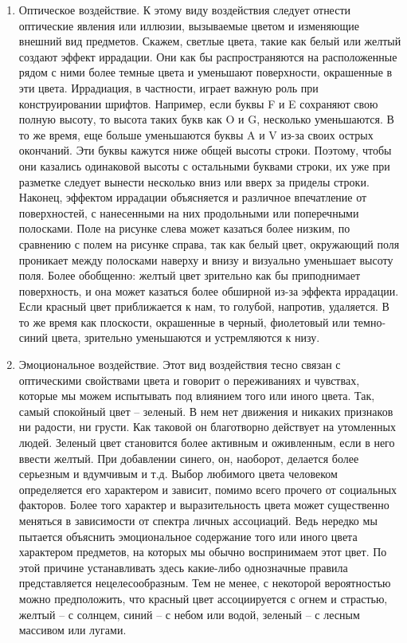 \begin{enumerate}
\item Оптическое воздействие. К этому виду воздействия следует отнести
  оптические явления или иллюзии, вызываемые цветом и изменяющие внешний вид
  предметов. Скажем, светлые цвета, такие как белый или желтый создают эффект
  иррадации. Они как бы распространяются на расположенные рядом с ними более
  темные цвета и уменьшают поверхности, окрашенные в эти цвета. Иррадиация,
  в частности, играет важную роль при конструировании шрифтов. Например, если
  буквы F и E сохраняют свою полную высоту, то высота таких букв как O и G,
  несколько уменьшаются. В то же время, еще больше уменьшаются буквы A и V
  из-за своих острых окончаний. Эти буквы кажутся ниже общей высоты строки.
  Поэтому, чтобы они казались одинаковой высоты с остальными буквами строки,
  их уже при разметке следует вынести несколько вниз или вверх за приделы строки.
  Наконец, эффектом иррадации объясняется и различное впечатление от поверхностей,
  с нанесенными на них продольными или поперечными полосками. %
  Поле на рисунке слева может казаться более низким, по сравнению с полем на
  рисунке справа, так как белый цвет, окружающий поля проникает между
  полосками наверху и внизу и визуально уменьшает высоту поля. Более
  обобщенно: желтый цвет зрительно как бы приподнимает поверхность, и она
  может казаться более обширной из-за эффекта иррадации. Если красный цвет
  приближается к нам, то голубой, напротив, удаляется. В то же время как
  плоскости, окрашенные в черный, фиолетовый или темно-синий цвета, зрительно
  уменьшаются и устремляются к низу.

\item Эмоциональное воздействие. Этот вид воздействия тесно связан с
  оптическими свойствами цвета и говорит о переживаниях и чувствах, которые
  мы можем испытывать под влиянием того или иного цвета. Так, самый спокойный
  цвет -- зеленый. В нем нет движения и никаких признаков ни радости, ни грусти.
  Как таковой он благотворно действует на утомленных людей. Зеленый цвет
  становится более активным и оживленным, если в него ввести желтый. При
  добавлении синего, он, наоборот, делается более серьезным и вдумчивым и т.д.
  Выбор любимого цвета человеком определяется его характером и зависит, помимо
  всего прочего от социальных факторов. Более того характер и выразительность
  цвета может существенно меняться в зависимости от спектра личных ассоциаций.
  Ведь нередко мы пытается объяснить эмоциональное содержание того или иного
  цвета характером предметов, на которых мы обычно воспринимаем этот цвет.
  По этой причине устанавливать здесь какие-либо однозначные правила
  представляется нецелесообразным. Тем не менее, с некоторой вероятностью
  можно предположить, что красный цвет ассоциируется с огнем и страстью,
  желтый -- с солнцем, синий -- с небом или водой, зеленый -- с лесным массивом
  или лугами.

\end{enumerate}


